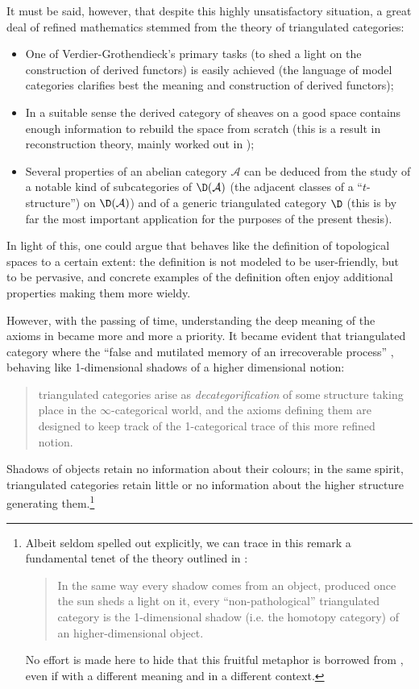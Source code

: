 \documentclass[11pt, a4paper]{amsart}
\renewcommand{\A}{\mathcal{A}}
\begin{document}
It must be said, however, that despite this highly unsatisfactory situation, a great deal of refined mathematics stemmed from the theory of triangulated categories:
\begin{itemize} 
\item One of Verdier-Grothendieck's primary tasks (to shed a light on the construction of derived functors) is easily achieved (the language of model categories clarifies best the meaning and construction of derived functors); 
\item In a suitable sense the derived category of sheaves on a good space contains enough information to rebuild the space from scratch (this is a result in reconstruction theory, mainly worked out in \cite{bondal2001reconstruction});
\item  Several properties of an abelian category $\A$ can be deduced from the study of a notable kind of subcategories of $\D(\A)$ (the adjacent classes of a ``$t$-structure'') on $\D(\A)$) and of a generic triangulated category $\D$ (this is by far the most important application for the purposes of the present thesis).
\end{itemize}
In light of this, one could argue that \adef {} behaves like the definition of topological spaces to a certain extent: the definition is not modeled to be user-friendly, but to be pervasive, and concrete examples of the definition often enjoy additional properties making them more wieldy. 

However, with the passing of time, understanding the deep meaning of the axioms in \adef {} became more and more a priority. It became evident that triangulated category where the ``false and mutilated memory of an irrecoverable process'' \cite{borgesEN}, behaving like 1-dimensional shadows of a higher dimensional notion: 
\begin{quote}
triangulated categories arise as \emph{decategorification} of some structure taking place in the $\infty$-categorical world, and the axioms defining them are designed to keep track of the 1-categorical trace of this more refined notion.
\end{quote}
Shadows of objects retain no information about their colours; in the same spirit, triangulated categories retain little or no information about the higher structure generating them.\footnote{Albeit seldom spelled out explicitly, we can trace in this remark a fundamental tenet of the theory outlined in \cite{LurieHA}:
\begin{quote}
In the same way every shadow comes from an object, produced once the sun sheds a light on it, every ``non-pathological'' triangulated category is the 1-dimensional shadow (i.e. the homotopy category) of an higher-dimensional object.
\end{quote}
No effort is made here to hide that this fruitful metaphor is borrowed from \cite{Olivia}, even if with a different meaning and in a different context.}
\end{document}
